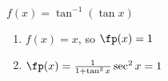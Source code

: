 {$f(x) =\tan^{-1}(\tan x)$
}
{\begin{enumerate}
\item		$f(x) = x$, so $\fp(x) = 1$
\item		$\fp(x) = \frac{1}{1+\tan^2x}\sec^2 x = 1$
\end{enumerate}
}
